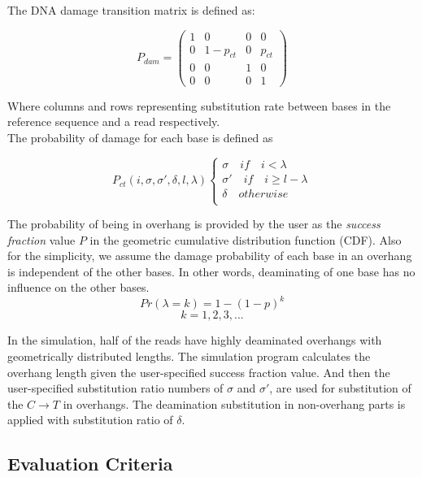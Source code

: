 \documentclass[11pt,a4paper]{report}
\begin{document}
The DNA damage transition matrix is defined as:

$$ P_{dam} = 
 \begin{pmatrix}
  1 & 0 & 0 & 0 \\
  0 & 1-p_{ct} & 0 & p_{ct} \\
  0  & 0  & 1 & 0  \\
  0 & 0 & 0 & 1 
 \end{pmatrix}$$
 
Where columns and rows representing substitution rate between 
bases in the reference sequence and a read respectively.\\
The probability of damage for each base is defined as 

\[ P_{ct}(i, \sigma, \sigma', \delta, l, \lambda ) 
\begin{cases}
    \sigma  \quad if \quad i < \lambda  \\
    \sigma' \quad if \quad i \geq l-\lambda \\
    \delta \quad otherwise  \\
\end{cases}
\]

The probability of being in overhang is provided by the user as the 
\emph{success fraction} value $P$ in the geometric cumulative distribution 
function (CDF). Also for the simplicity, we assume the damage probability 
of each base  in an overhang is independent of the other bases. In other 
words, deaminating of one base has no influence on the other bases.\\

$$Pr( \lambda = k ) = 1 - (1 - p)^{k}$$
$$ k = 1, 2, 3, ... $$

In the simulation, half of the reads have highly deaminated overhangs
with geometrically distributed lengths. The simulation program calculates 
the overhang length given the user-specified success fraction value.
And then the user-specified substitution ratio numbers of $ \sigma $ 
and $\sigma' $,  are used for substitution of the $ C \rightarrow T$ 
in overhangs. The deamination substitution  in non-overhang parts is 
applied with substitution ratio of $\delta$.





\subsection{Evaluation Criteria} \label{Evaluation Criteria}
\end{document}
